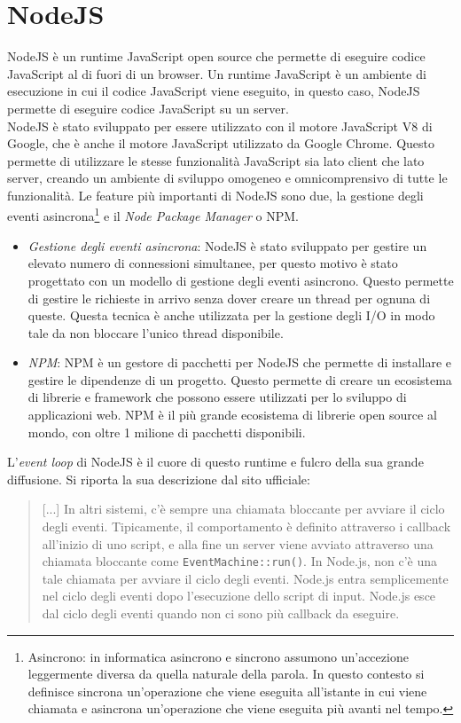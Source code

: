 \section{NodeJS}\label{sec:NodeJS}
NodeJS è un runtime JavaScript open source che permette di eseguire codice JavaScript al di fuori di un browser\cite{NodeJS}. Un runtime JavaScript è un ambiente di esecuzione
in cui il codice JavaScript viene eseguito, in questo caso, NodeJS permette di eseguire codice JavaScript su un server.\\
NodeJS è stato sviluppato per essere utilizzato con il motore JavaScript V8 di Google, che è anche il motore JavaScript utilizzato da Google Chrome. Questo permette di utilizzare
le stesse funzionalità JavaScript sia lato client che lato server, creando un ambiente di sviluppo omogeneo e omnicomprensivo di tutte le funzionalità. Le feature più importanti
di NodeJS sono due, la gestione degli eventi asincrona\footnote{Asincrono: in informatica asincrono e sincrono assumono un'accezione leggermente diversa da quella 
naturale della parola. In questo contesto si definisce sincrona un'operazione che viene eseguita all'istante in cui viene chiamata e asincrona un'operazione che viene eseguita
più avanti nel tempo.} e il \textit{Node Package Manager} o NPM.
\begin{itemize}
    \item \textit{Gestione degli eventi asincrona}: NodeJS è stato sviluppato per gestire un elevato numero di connessioni simultanee, per questo motivo è stato progettato con un
    modello di gestione degli eventi asincrono. Questo permette di gestire le richieste in arrivo senza dover creare un thread per ognuna di queste.
    Questa tecnica è anche utilizzata per la gestione degli I/O in modo tale da non bloccare l'unico thread disponibile.
    \item \textit{NPM}: NPM è un gestore di pacchetti per NodeJS che permette di installare e gestire le dipendenze di un progetto. Questo permette di creare un ecosistema di
    librerie e framework che possono essere utilizzati per lo sviluppo di applicazioni web. NPM è il più grande ecosistema di librerie open source al mondo, con oltre 1 milione
    di pacchetti disponibili.
\end{itemize}
L'\textit{event loop} di NodeJS è il cuore di questo runtime e fulcro della sua grande diffusione. Si riporta la sua descrizione dal sito ufficiale\cite{NodeJS}:
\begin{quote}
    [...] In altri sistemi, c'è sempre una chiamata bloccante per avviare il ciclo degli eventi. Tipicamente, il comportamento è definito attraverso i callback all'inizio di uno script, 
    e alla fine un server viene avviato attraverso una chiamata bloccante come \texttt{EventMachine::run()}. In Node.js, non c'è una tale chiamata per avviare il ciclo degli eventi. Node.js 
    entra semplicemente nel ciclo degli eventi dopo l'esecuzione dello script di input. Node.js esce dal ciclo degli eventi quando non ci sono più callback da eseguire.
\end{quote}
